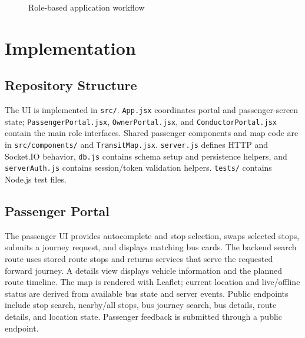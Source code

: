 \documentclass[12pt,a4paper]{report}
\begin{document}
\begin{figure}[tbp]\centering
{}\caption{Role-based application workflow}\label{fig:workflow}\end{figure}

\chapter{Implementation}
\section{Repository Structure}
The UI is implemented in \texttt{src/}. \texttt{App.jsx} coordinates portal and passenger-screen state; \texttt{PassengerPortal.jsx}, \texttt{OwnerPortal.jsx}, and \texttt{ConductorPortal.jsx} contain the main role interfaces. Shared passenger components and map code are in \texttt{src/components/} and \texttt{TransitMap.jsx}. \texttt{server.js} defines HTTP and Socket.IO behavior, \texttt{db.js} contains schema setup and persistence helpers, and \texttt{serverAuth.js} contains session/token validation helpers. \texttt{tests/} contains Node.js test files.

\section{Passenger Portal}
The passenger UI provides autocomplete and stop selection, swaps selected stops, submits a journey request, and displays matching bus cards. The backend search route uses stored route stops and returns services that serve the requested forward journey. A details view displays vehicle information and the planned route timeline. The map is rendered with Leaflet; current location and live/offline status are derived from available bus state and server events. Public endpoints include stop search, nearby/all stops, bus journey search, bus details, route details, and location state. Passenger feedback is submitted through a public endpoint.
\end{document}
